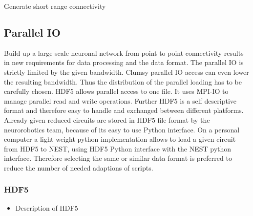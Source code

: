 \documentclass[a4paper]{article}
\begin{document}
   \begin{algorithm}
	\label{algshort}
	
	
\caption{Generate short range connectivity}
\end{algorithm}

\subsection{Parallel IO}
Build-up a large scale neuronal network from point to point connectivity results in new requirements for data processing and the data format. The parallel IO is strictly limited by the given bandwidth. Clumsy parallel IO access can even lower the resulting bandwidth.
Thus the distribution of the parallel loading has to be carefully chosen. HDF5 allows parallel access to one file.
It uses MPI-IO to manage parallel read and write operations. Further HDF5 is a self descriptive format and therefore easy to handle
and exchanged between different platforms. Already given reduced circuits are stored in HDF5 file format by the neurorobotics team, 
because of its easy to use Python interface. On a personal computer a light weight python implementation allows to load a given
circuit from HDF5 to NEST, using HDF5 Python interface with the NEST python interface. Therefore selecting the same or similar data 
format is preferred to reduce the number of needed adaptions of scripts.


\subsubsection{HDF5}

\begin{itemize}
      \item Description of HDF5
\end{itemize}
\end{document}
